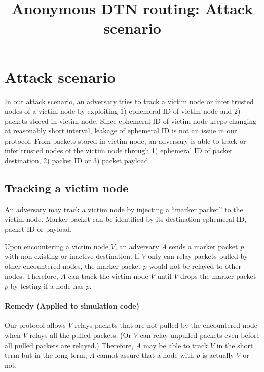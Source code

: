 \documentclass[11pt]{article}
\begin{document}
\title{Anonymous DTN routing: Attack scenario}
\maketitle

\section{Attack scenario}
In our attack scenario, an adversary tries to track a victim node or infer trusted nodes of a victim node by exploiting 1) ephemeral ID of victim node and 2) packets stored in victim node.
Since ephemeral ID of victim node keeps changing at reasonably short interval, leakage of ephemeral ID is not an issue in our protocol. 
From packets stored in victim node, an adversary is able to track or infer trusted nodes of the victim node through 1) ephemeral ID of packet destination, 2) packet ID or 3) packet payload. 



\subsection{Tracking a victim node}
An adversary may track a victim node by injecting a ``marker packet'' to the victim node. 
Marker packet can be identified by its destination ephemeral ID, packet ID or payload.  


Upon encountering a victim node $V$, an adversary $A$ sends a marker packet $p$ with non-existing or inactive destination. 
If $V$ only can relay packets pulled by other encountered nodes, the marker packet $p$ would not be relayed to other nodes. 
Therefore, $A$ can track the victim node $V$ until $V$ drops the marker packet $p$ by testing if a node has $p$. 

\paragraph{Remedy (Applied to simulation code)}
Our protocol allows $V$ relays packets that are not pulled by the encountered node when $V$ relays all the pulled packets. 
(Or $V$ can relay unpulled packets even before all pulled packets are relayed.)
Therefore, $A$ may be able to track $V$ in the short term but in the long term, $A$ cannot assure that a node with $p$ is actually $V$ or not. 
\end{document}
